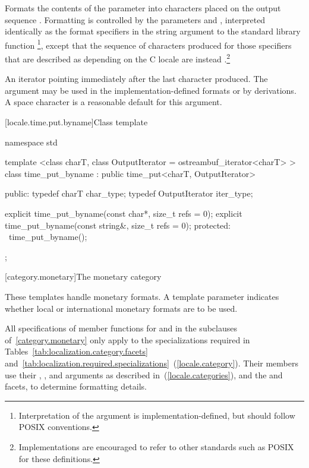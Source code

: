 \begin{itemdescr}
\pnum
\effects
Formats the contents of the parameter 
into characters placed on the output sequence .
Formatting is controlled by the parameters  and ,
interpreted identically as the format specifiers in the string
argument to the standard library function
%
\footnote{Interpretation of the 
argument is implementation-defined, but should follow POSIX
conventions.},
except that the sequence of characters produced for those specifiers
that are described as depending on the C locale are instead .\footnote{Implementations are encouraged to refer to other standards
such as POSIX
for these definitions.}

\pnum
\returns
An iterator pointing immediately after the last character produced.
\enternote
The  argument may be used in the implementation-defined
formats or by derivations. A space character is a reasonable
default for this argument.
\exitnote
\end{itemdescr}

[locale.time.put.byname]{Class template }

%
\begin{codeblock}
namespace std {
  template <class charT, class OutputIterator = ostreambuf_iterator<charT> >
  class time_put_byname : public time_put<charT, OutputIterator>
  {
  public:
    typedef charT          char_type;
    typedef OutputIterator iter_type;

    explicit time_put_byname(const char*, size_t refs = 0);
    explicit time_put_byname(const string&, size_t refs = 0);
  protected:
    ~time_put_byname();
  };
}
\end{codeblock}

[category.monetary]{The monetary category}

\pnum
These templates handle monetary formats.
A template parameter indicates whether
local or international monetary formats are to be used.

\pnum
All specifications of member functions for
and
in the subclauses of~\ref{category.monetary} only apply to the
specializations required in Tables~\ref{tab:localization.category.facets}
and~\ref{tab:localization.required.specializations}~(\ref{locale.category}).
Their members use their
,
,
and
arguments as described in~(\ref{locale.categories}), and the
and
facets, to determine formatting details.

